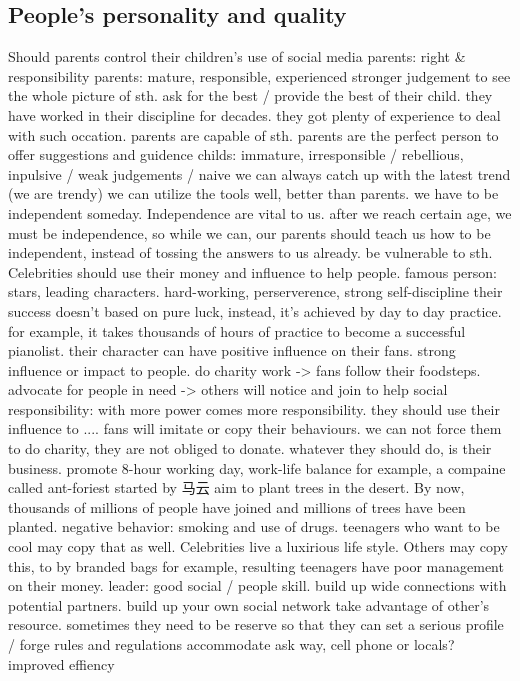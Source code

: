 \documentclass{ctexart}
\begin{document}
\subsection{People's personality and quality}
\begin{outline}
    \1 Should parents control their children's use of social media  
        \2 parents: right \& responsibility
        \2 parents: mature, responsible, experienced
            \3 stronger judgement to see the whole picture of sth.
            \3 ask for the best / provide the best of their child.
            \3 they have worked in their discipline for decades.
                \4 they got plenty of experience to deal with such occation.
                \4 parents are capable of sth.
            \3 parents are the perfect person to offer suggestions and guidence
        \2 childs: immature, irresponsible / rebellious, inpulsive / weak judgements / naive
            \3 we can always catch up with the latest trend (we are trendy)
                \4 we can utilize the tools well, better than parents.
            \3 we have to be independent someday. 
                \4 Independence are vital to us. after we reach certain age, we must be independence, so while we can, our parents should teach us how to be independent, instead of tossing the answers to us already.
        \2 be vulnerable to sth.
    \1 Celebrities should use their money and influence to help people.
        \2 famous person: stars, leading characters.
            \3 hard-working, perserverence, strong self-discipline
                \4 their success doesn't based on pure luck, instead, it's achieved by day to day practice.
                \4 for example, it takes thousands of hours of practice to become a successful pianolist. their character can have positive influence on their fans.
            \3 strong influence or impact to people.
                \4 do charity work -> fans follow their foodsteps.
                \4 advocate for people in need -> others will notice and join to help
        \2 social responsibility:
            \3 with more power comes more responsibility.
            \3 they should use their influence to ....
            \3 fans will imitate or copy their behaviours.
        \2 we can not force them to do charity, they are not obliged to donate. whatever they should do, is their business.
        \2 promote 8-hour working day, work-life balance
        \2 for example, a compaine called ant-foriest started by 马云 aim to plant trees in the desert. By now, thousands of millions of people have joined and millions of trees have been planted.
    \1 negative behavior: smoking and use of drugs.
        \2 teenagers who want to be cool may copy that as well.
    \1 Celebrities live a luxirious life style. Others may copy this, to by branded bags for example, resulting teenagers have poor management on their money.
    \1 leader:
        \2 good social / people skill.
        \2 build up wide connections with potential partners.
        \2 build up your own social network
        \2 take advantage of other's resource.
        \2 
        \2 sometimes they need to be reserve so that they can  set a serious profile / forge rules and regulations
    \1 accommodate
    \1 ask way, cell phone or locals?
        \2 improved effiency
\end{outline}
\end{document}
